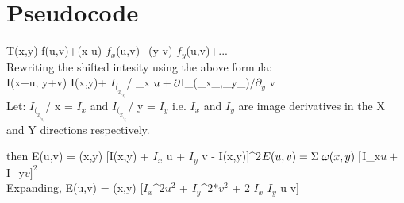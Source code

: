 \documentclass{article}
\begin{document}
\section{Pseudocode}
 T(x,y) \approx f(u,v)+(x-u) $f_x$(u,v)+(y-v) $f_y$(u,v)+... \\
 


Rewriting the shifted intesity using the above formula:\\ 
I(x+u, y+v) \approx I(x,y)+ \partial $I_(_x_,_y_)$/ \partial _x$ \hspace{0,1cm} u +  \partial $I_(_x_,_y_)$/ \partial _y$ \hspace{0,1cm} v \\


Let: \partial $I_(_x_,_y_)$/ \partial x = $I_x$\hspace{0,2cm} and 
\hspace{0,2cm}\partial  $I_(_x_,_y_)$/ \partial y = $I_y$ \hfill \medskip \break 
i.e. \hspace{0,2cm} $I_x$ \hspace{0,2cm} and \hspace{0,2cm} $I_y$ \hspace{0,2cm} are \hspace{0,2cm} image \hspace{0,1cm} derivatives  \hspace{0,1cm}
in \hspace{0,1cm} the\hspace{0,1cm} X \hspace{0,1cm}and\hspace{0,1cm} Y \hspace{0,1cm}directions\hspace{0,1cm} respectively. 

then
\break 
\vspace{1cm} 
E(u,v) = \Sigma \hspace{0,1cm} \omega(x,y) \hspace{0,1cm} [I(x,y) + $I_x$  u + $I_y$  v - I(x,y)]^2$  

E(u,v) = \Sigma \hspace{0,1cm} \omega(x,y)\hspace{0,1cm}[$I_x$u + $I_y$v]^2$ \\


Expanding, E(u,v) = \Sigma \hspace{0,1cm} \omega(x,y) \hspace{0,1cm} [$I_x$^2$ u^2$ + $I_y$^2$ * v^2$ + 2 $I_x$ $I_y$ u v] \\
\end{document}

